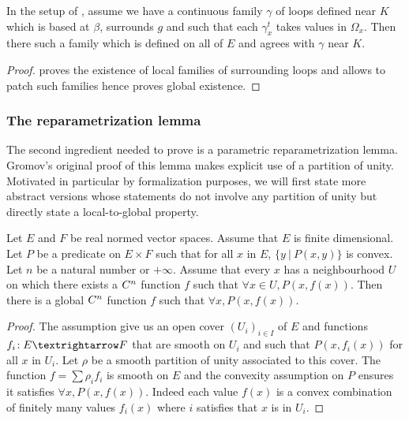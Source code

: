 \begin{lemma}
  \label{lem:∃_surrounding_loops}
  \leanok
  In the setup of , assume we have a
  continuous family $γ$ of loops defined near $K$ which is based at $β$,
  surrounds $g$ and such that each $γ_x^t$ takes values in $Ω_x$.
  Then there such a family which is defined on all of $E$ and agrees
  with $γ$ near $K$.
\end{lemma}

\begin{proof}
  \leanok
   proves the existence of local families of surrounding
  loops and  allows to patch such families hence
   proves global existence.
\end{proof}

\subsubsection*{The reparametrization lemma}

The second ingredient needed to prove  is a
parametric reparametrization lemma. Gromov's original proof of this lemma makes
explicit use of a partition of unity. Motivated in particular by formalization
purposes, we will first state more abstract versions whose statements do not involve
any partition of unity but directly state a local-to-global property.

\begin{lemma}
  \label{lem:exists_cont_diff_of_convex}
  \leanok
  Let $E$ and $F$ be real normed vector spaces. Assume that $E$ is finite
  dimensional. Let $P$ be a predicate on $E \times F$ such that for all $x$ in
  $E$, $\{y ~|~ P (x, y) \}$ is convex. Let $n$ be a natural number or $+\infty$.
  Assume that every $x$ has a neighbourhood $U$ on which there exists a $C^n$
  function $f$ such that $\forall x ∈ U, P(x, f(x))$. Then there is a global
  $C^n$ function $f$ such that $\forall x, P(x, f(x))$.
\end{lemma}

\begin{proof}
  \leanok
  The assumption give us an open cover $(U_i)_{i ∈ I}$ of $E$ and functions
  $f_i \co E → F$ that are smooth on $U_i$ and such that $P(x, f_i(x))$ for all $x$ in $U_i$.
  Let $ρ$ be a smooth partition of unity associated to this cover. The function
  $f = ∑ ρ_i f_i$ is smooth on $E$ and the convexity assumption on $P$ ensures
  it satisfies $\forall x, P(x, f(x))$. Indeed each value $f(x)$ is a convex combination
  of finitely many values $f_i(x)$ where $i$ satisfies that $x$ is in $U_i$.
\end{proof}

